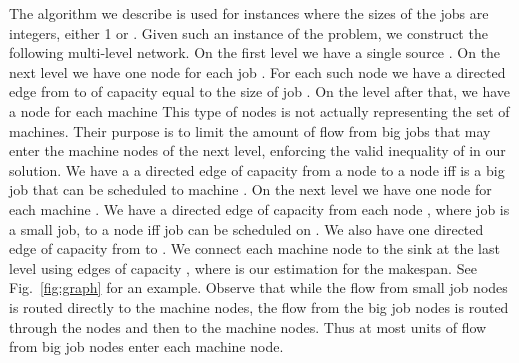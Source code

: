 \documentclass[11pt]{article}\usepackage{amsmath}
\begin{document}
The algorithm we describe is used for instances where the sizes of the jobs are integers, either 1 or .
Given  such an  instance  of   the  problem,  we  construct  the  following
multi-level  network. On  the  first  level we  have  a single  source
. On the  next level we have one node  for each  job . For
each such  node   we have a  directed edge  from  to   of
capacity equal  to the size  of job .  On the level after  that, we
have a node  for each  machine  This type of nodes is not
actually representing the  set of machines. Their purpose  is to limit
the amount of flow from big jobs that may enter the machine nodes of
the next level, enforcing  the valid inequality of \cite{ebenlendr} in
our solution.  
We have a a directed  edge of capacity   from a node
 to a node   iff  is a big job that can be scheduled
to machine  . On  the next level  we have  one node   for each
machine .  We have a directed  edge of capacity   from each node
, where job   is a small job, to a node   iff job  can
be scheduled  on . We also  have one directed edge  of capacity 
from   to .  We connect each  machine node   to the
sink  at  the last level using edges of capacity  , where  is
our  estimation for  the makespan.  See Fig.~\ref{fig:graph} 
for an example. Observe that  while the  flow from
small job nodes is routed directly to the machine nodes, the flow from
the big  job nodes is routed  through the nodes   and then to
the machine nodes.  Thus at most  units of flow  from big job nodes
enter each machine node.
\end{document}

